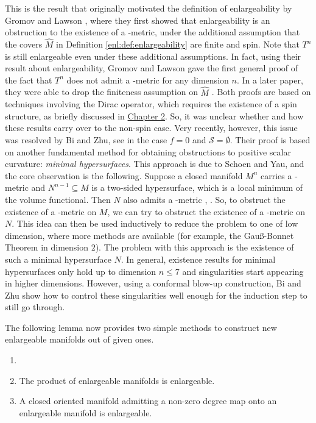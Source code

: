 This is the result that originally motivated the definition of enlargeability by Gromov and Lawson \cite{gromov1980spin}, where they first showed that enlargeability is an obstruction to the existence of a \psc-metric, under the additional assumption that the covers $\hat{M}$ in Definition \ref{enl:def:enlargeability} are finite and spin. Note that $T^n$ is still enlargeable even under these additional assumptions. In fact, using their result about enlargeability, Gromov and Lawson gave the first general proof of the fact that $T^n$ does not admit a \psc-metric for any dimension $n$. In a later paper, they were able to drop the finiteness assumption on $\hat{M}$ \cite{Gromov1983}. Both proofs are based on techniques involving the Dirac operator, which requires the existence of a spin structure, as briefly discussed in \hyperref[chapter:psc]{Chapter 2}. 
So, it was unclear whether and how these results carry over to the non-spin case. Very recently, however, this issue was resolved by Bi and Zhu, see \cite[Theorem D]{bi2026positivescalarcurvatureobstructions} in the case $f=0$ and $\mathcal{S} = \emptyset$. Their proof is based on another fundamental method for obtaining obstructions to positive scalar curvature: \emph{minimal hypersurfaces}. This approach is due to Schoen and Yau, and the core observation is the following. Suppose a closed manifold $M^n$ carries a \psc-metric and $N^{n-1} \subseteq M$ is a two-sided hypersurface, which is a local minimum of the volume functional. Then $N$ also admits a \psc-metric \cite[Proof of Thm. 1]{SchoenYau1979}, \cite[Prop. 2.25]{Lee2019}. So, to obstruct the existence of a \psc-metric on $M$, we can try to obstruct the existence of a \psc-metric on $N$. This idea can then be used \linebreak inductively to reduce the problem to one of low dimension, where more methods are available  (for example, the Gauß-Bonnet Theorem in dimension $2$). The problem with this approach is the existence of such a minimal hypersurface $N$. In general, existence results for minimal hypersurfaces only hold up to dimension $n \leq 7$ and singularities start appearing in higher dimensions. However, using a conformal blow-up construction, Bi and Zhu show how to control these singularities well enough for the induction step to still go through.

The following lemma now provides two simple methods to construct new enlargeable manifolds out of given ones. 

\begin{lemma}
    \label{enl:lem:constructing_enlargeable_mnf}
    \begin{enumerate}[label=(\roman*)]
        \item[]
        \item \vspace{-.5em} The product of enlargeable manifolds is enlargeable. \label{enl:eq:lem_for_constructing_enlargeable_mnf_1}
        \item A closed oriented manifold admitting a non-zero degree map onto an enlargeable manifold is enlargeable. \label{enl:eq:lem_for_constructing_enlargeable_mnf_2}
    \end{enumerate}
\end{lemma}

